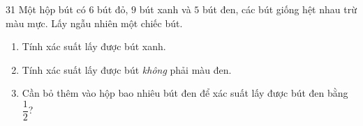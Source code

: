 \clearpage
{}

\begin{probbox}{31}{\relax}
Một hộp bút có $6$ bút đỏ, $9$ bút xanh và $5$ bút đen, các bút giống hệt nhau trừ màu mực. Lấy ngẫu nhiên một chiếc bút.
\begin{enumerate}[label=\alph*),leftmargin=1.5em,itemsep=0pt,topsep=2pt]
\item Tính xác suất lấy được bút xanh.
\item Tính xác suất lấy được bút \emph{không} phải màu đen.
\item Cần bỏ thêm vào hộp bao nhiêu bút đen để xác suất lấy được bút đen bằng $\dfrac12$?
\end{enumerate}
\end{probbox}
